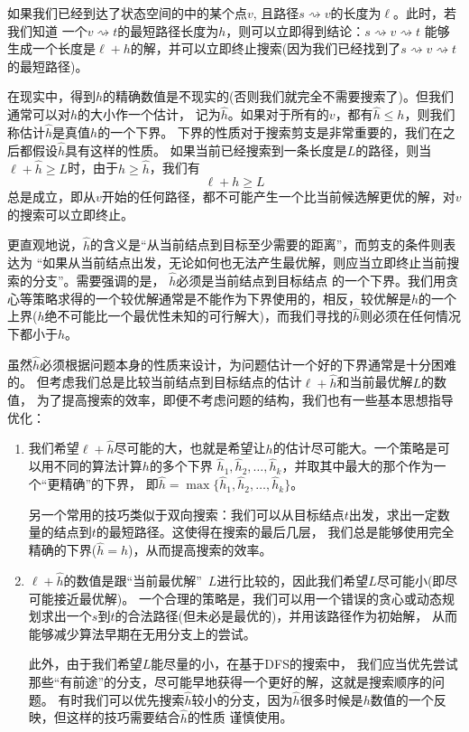 如果我们已经到达了状态空间的中的某个点$v$, 且路径$s\rightsquigarrow v$的长度为$\ell$。此时，若我们知道
一个$v\rightsquigarrow t$的最短路径长度为$h$，则可以立即得到结论：$s\rightsquigarrow v\rightsquigarrow t$
能够生成一个长度是$\ell + h$的解，并可以立即终止搜索(因为我们已经找到了$s\rightsquigarrow v\rightsquigarrow t$
的最短路径)。

在现实中，得到$h$的精确数值是不现实的(否则我们就完全不需要搜索了)。但我们通常可以对$h$的大小作一个估计，
记为$\hat{h}$。如果对于所有的$v$，都有$\hat{h}\le h$，则我们称估计$\hat{h}$是真值$h$的一个下界。
下界的性质对于搜索剪支是非常重要的，我们在之后都假设$\hat h$具有这样的性质。
如果当前已经搜索到一条长度是$L$的路径，则当$\ell + \hat{h} \ge L$时，由于$h\ge \hat{h}$，我们有
$$\ell + h \ge L$$总是成立，即从$v$开始的任何路径，都不可能产生一个比当前候选解更优的解，对$v$的搜索可以立即终止。

更直观地说，$\hat h$的含义是``从当前结点到目标至少需要的距离''，而剪支的条件则表达为
``如果从当前结点出发，无论如何也无法产生最优解，则应当立即终止当前搜索的分支''。需要强调的是，
$\hat h$必须是当前结点到目标结点
的一个下界。我们用贪心等策略求得的一个较优解通常是不能作为下界使用的，相反，较优解是$h$的一个
上界($h$绝不可能比一个最优性未知的可行解大)，而我们寻找的$\hat h$则必须在任何情况下都小于$h$。

\medbreak

虽然$\hat h$必须根据问题本身的性质来设计，为问题估计一个好的下界通常是十分困难的。
但考虑我们总是比较当前结点到目标结点的估计$\ell + \hat h$和当前最优解$L$的数值，
为了提高搜索的效率，即便不考虑问题的结构，我们也有一些基本思想指导优化：

\begin{enumerate}
 \item 我们希望$\ell+\hat{h}$尽可能的大，也就是希望让$h$的估计尽可能大。一个策略是可以用不同的算法计算$h$的多个下界
   $\hat h_1, \hat h_2, \ldots, \hat h_k$，并取其中最大的那个作为一个``更精确''的下界，
   即$\hat h= \max\{ \hat h_1, \hat h_2, \ldots, \hat h_k\}$。
   
   另一个常用的技巧类似于双向搜索：我们可以从目标结点$t$出发，求出一定数量的结点到$t$的最短路径。这使得在搜索的最后几层，
   我们总是能够使用完全精确的下界($\hat h=h$)，从而提高搜索的效率。
 \item $\ell + \hat{h}$的数值是跟``当前最优解''\ $L$进行比较的，因此我们希望$L$尽可能小(即尽可能接近最优解)。
   一个合理的策略是，我们可以用一个错误的贪心或动态规划求出一个$s$到$t$的合法路径(但未必是最优的)，并用该路径作为初始解，
   从而能够减少算法早期在无用分支上的尝试。
   
   此外，由于我们希望$L$能尽量的小，在基于DFS的搜索中，
   我们应当优先尝试那些``有前途''的分支，尽可能早地获得一个更好的解，这就是搜索顺序的问题。
   有时我们可以优先搜索$\hat{h}$较小的分支，因为$\hat{h}$很多时候是$h$数值的一个反映，但这样的技巧需要结合$\hat{h}$的性质
   谨慎使用。
\end{enumerate}

